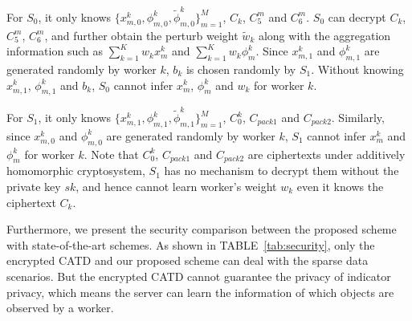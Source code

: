 \documentclass[conference]{IEEEtran}
\begin{document}
For $S_0$, it only knows $\{x_{m,0}^k, \phi_{m,0}^k, \tilde{\phi}_{m,0}^k\}_{m=1}^M$, $C_k$, $C_5^m$ and $C_6^m$.
$S_0$ can decrypt $C_k$, $C_5^m$, $C_6^m$, and further obtain the perturb weight $\tilde{w}_k$ along with the aggregation information such as $\sum_{k=1}^K w_k x_m^k$ and $\sum_{k=1}^K w_k \phi_m^k$.
Since $x_{m,1}^k$ and $\phi_{m,1}^k$ are generated randomly by worker $k$, $b_k$ is chosen randomly by $S_1$.
Without knowing $x_{m,1}^k$, $\phi_{m,1}^k$ and $b_k$, $S_0$ cannot infer $x_m^k$, $\phi_m^k$ and $w_k$ for worker $k$.

For $S_1$, it only knows $\{x_{m,1}^k, \phi_{m,1}^k, \tilde{\phi}_{m,1}^k\}_{m=1}^M$, $C_0^k$, $C_{pack1}$ and $C_{pack2}$.
Similarly, since $x_{m,0}^k$ and $\phi_{m,0}^k$ are generated randomly by worker $k$, $S_1$ cannot infer $x_m^k$ and $\phi_m^k$ for worker $k$.
Note that $C_0^k$, $C_{pack1}$ and $C_{pack2}$ are ciphertexts under additively homomorphic cryptosystem, $S_1$ has no mechanism to decrypt them without the private key $sk$, and hence cannot learn worker's weight $w_k$ even it knows the ciphertext $C_k$.

Furthermore, we present the security comparison between the proposed scheme with state-of-the-art schemes.
As shown in TABLE~\ref{tab:security}, only the encrypted CATD and our proposed scheme can deal with the sparse data scenarios.
But the encrypted CATD cannot guarantee the privacy of indicator privacy, which means the server can learn the information of which objects are observed by a worker. 
\end{document}
